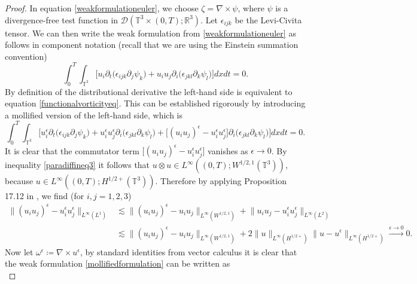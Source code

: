\documentclass[12pt,a4paper]{article}
\theoremstyle{definition}
\theoremstyle{remark}
\numberwithin{equation}{section}
\begin{document}
\begin{proof}
In equation \eqref{weakformulationeuler}, we choose $\zeta = \nabla \times \psi$, where $\psi$ is a divergence-free test function in $\mathcal{D} (\mathbb{T}^3 \times (0,T); \mathbb{R}^3)$. Let $\epsilon_{ijk}$ be the Levi-Civita tensor. We can then write the weak formulation from \eqref{weakformulationeuler} as follows in component notation (recall that we are using the Einstein summation convention)
\begin{equation*}
\int_0^T \int_{\mathbb{T}^3} \bigg[ u_i \partial_t \big( \epsilon_{ijk} \partial_j \psi_k \big) + u_i u_j \partial_i \big( \epsilon_{jkl} \partial_k \psi_l) \bigg] dx dt = 0.
\end{equation*}
By definition of the distributional derivative the left-hand side is equivalent to equation \eqref{functionalvorticityeq}. This can be established rigorously by introducing a mollified version of the left-hand side, which is
\begin{equation} \label{mollifiedformulation}
\int_0^T \int_{\mathbb{T}^3} \bigg[ u_i^\epsilon \partial_t \big( \epsilon_{ijk} \partial_j \psi_k \big) + u_i^\epsilon u_j^\epsilon \partial_i \big( \epsilon_{jkl} \partial_k \psi_l) + \big[ (u_i u_j)^\epsilon - u_i^\epsilon u_j^\epsilon \big] \partial_i \big( \epsilon_{jkl} \partial_k \psi_l) \bigg] dx dt = 0.
\end{equation}
It is clear that the commutator term $\big[ (u_i u_j)^\epsilon - u_i^\epsilon u_j^\epsilon \big]$ vanishes as $\epsilon \rightarrow 0$. By inequality \eqref{paradiffineq3} it follows that $u \otimes u \in L^\infty ((0,T); W^{1/2,1} (\mathbb{T}^3))$, because $u \in L^\infty ((0,T); H^{1/2+} (\mathbb{T}^3))$. Therefore by applying Proposition 17.12 in \cite{leoni}, we find (for $i,j=1,2,3$)
\begin{align*}
\lVert (u_i u_j)^\epsilon - u_i^\epsilon u_j^\epsilon \rVert_{L^\infty (L^1)} &\lesssim \lVert (u_i u_j)^\epsilon - u_i u_j \rVert_{L^\infty (W^{1/2,1})} + \lVert u_i u_j - u_i^\epsilon u_j^\epsilon \rVert_{L^\infty (L^2)} \\
&\lesssim \lVert (u_i u_j)^\epsilon - u_i u_j \rVert_{L^\infty (W^{1/2,1})} + 2 \lVert u \rVert_{L^\infty (H^{1/2+})} \lVert u - u^\epsilon \rVert_{L^\infty (H^{1/2+})} \xrightarrow[]{\epsilon \rightarrow 0} 0.
\end{align*}
Now let $\omega^\epsilon \coloneqq \nabla \times u^\epsilon$, by standard identities from vector calculus it is clear that the weak formulation \eqref{mollifiedformulation} can be written as
\begin{equation*}

\end{equation*}
\end{proof}
\end{document}
